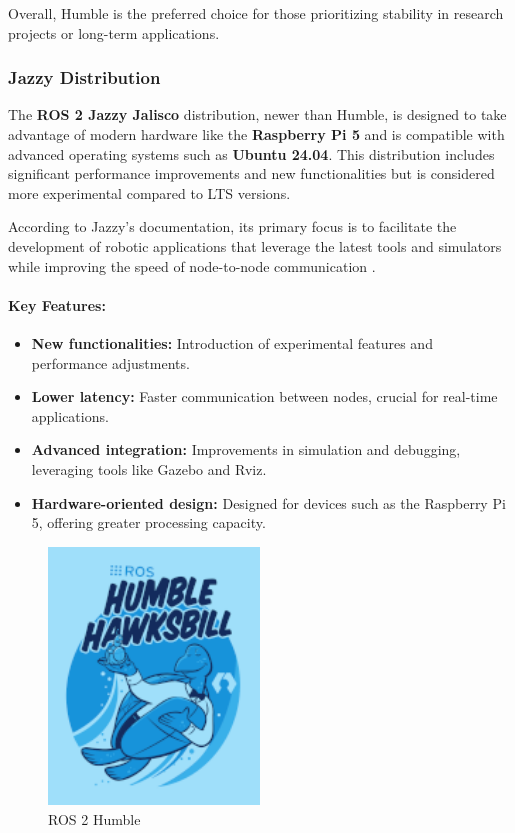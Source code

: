 Overall, Humble is the preferred choice for those prioritizing stability in research projects or long-term applications.

\subsubsection{Jazzy Distribution}

The \textbf{ROS 2 Jazzy Jalisco} distribution, newer than Humble, is designed to take advantage of modern hardware like the \textbf{Raspberry Pi 5} and is compatible with advanced operating systems such as \textbf{Ubuntu 24.04}. This distribution includes significant performance improvements and new functionalities but is considered more experimental compared to LTS versions.

According to Jazzy's documentation, its primary focus is to facilitate the development of robotic applications that leverage the latest tools and simulators while improving the speed of node-to-node communication \cite{jazzy_documentation}.

\paragraph{Key Features:}
\begin{itemize}
    \item \textbf{New functionalities:} Introduction of experimental features and performance adjustments.
    \item \textbf{Lower latency:} Faster communication between nodes, crucial for real-time applications.
    \item \textbf{Advanced integration:} Improvements in simulation and debugging, leveraging tools like Gazebo and Rviz.
    \item \textbf{Hardware-oriented design:} Designed for devices such as the Raspberry Pi 5, offering greater processing capacity.
\end{itemize}

\begin{figure}[h!]
    \centering
    \includegraphics[width=0.5\textwidth]{pictures/humble_logo.png}
    \caption{ROS 2 Humble}
    \label{fig:imagen1}
\end{figure}

